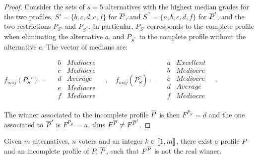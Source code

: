 \documentclass[version=3.21, pagesize, twoside=off, bibliography=totoc, DIV=calc, fontsize=12pt, a4paper]{scrartcl}
\begin{document}
\begin{proof}
	Consider the sets of $s=5$ alternatives with the highest median grades for the two profiles, $S'=\{b,c,d,e,f\}$ for $\overline{P}$, and $S^{\prime\prime}=\{a,b,c,d,f\}$ for $\overline{P}'$, and the two restrictions $P_{S'}$ and $P_{S^{\prime\prime}}$. In particular, $P_{S'}$ corresponds to the complete profile when eliminating the alternative $a$, and $P_{S^{\prime\prime}}$ to the complete profile without the alternative $e$.
	The vector of medians are:
	\begin{center}
		$f_{maj}(P_S')= \quad
		\begin{array}{cc}
			b &	Mediocre \\
			c &	Mediocre \\
			d &	Average	\\
			e &	Mediocre \\
			f & Mediocre \\
		\end{array} \quad,\quad%
		f_{maj}(P_S^{\prime\prime})= \quad
		\begin{array}{cc}
			a & Excellent \\
			b &	Mediocre \\
			c &	Mediocre \\
			d &	Average	\\
			f & Mediocre \\
		\end{array} \quad.
		$
	\end{center}
	The winner associated to the incomplete profile $\overline{P}$ is then $F^{P_{S'}} = d$ and the one associated to $\overline{P}'$ is $F^{P_{S^{\prime\prime}}} = a$, thus $F^{\overline{P}} \neq F^{\overline{P}'}$.
\end{proof}

\begin{corollary}
	Given $m$ alternatives, $n$ voters and an integer $k \in \llbracket1,m\rrbracket$, there exist a profile $P$ and an incomplete profile of $P$, $\overline{P}$, such that $F^{\overline{P}}$ is not the real winner.
\end{corollary}
\end{document}
